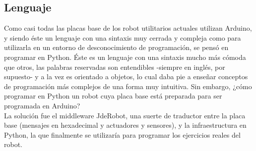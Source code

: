 \subsection{Lenguaje}
Como casi todas las placas base de los robot utilitarios actuales utilizan Arduino, y siendo éste un lenguaje con una sintaxis muy cerrada y compleja como para utilizarla en un entorno de desconocimiento de programación, se pensó en programar en Python. Éste es un lenguaje con una sintaxis mucho más cómoda que otros, las palabras reservadas son entendibles -siempre en inglés, por supuesto- y a la vez es orientado a objetos, lo cual daba pie a enseñar conceptos de programación más complejos de una forma muy intuitiva. Sin embargo, ¿cómo programar en Python un robot cuya placa base está preparada para ser programada en Arduino? \\
La solución fue el middleware JdeRobot, una suerte de traductor entre la placa base (mensajes en hexadecimal y actuadores y sensores), y la infraestructura en Python, la que finalmente se utilizaría para programar los ejercicios reales del robot. 